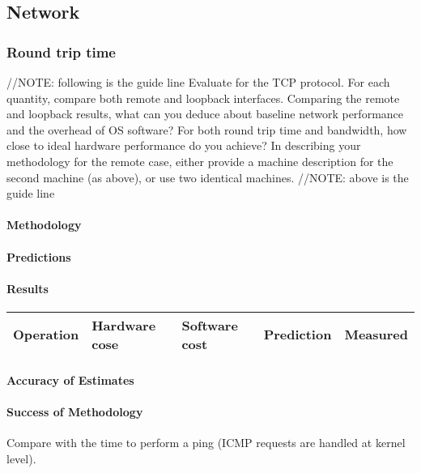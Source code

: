 \subsection{Network}

\subsubsection{Round trip time}

//NOTE: following is the guide line
Evaluate for the TCP protocol. For each quantity, compare both remote and loopback interfaces. Comparing the remote and loopback results, what can you deduce about baseline network performance and the overhead of OS software? For both round trip time and bandwidth, how close to ideal hardware performance do you achieve? In describing your methodology for the remote case, either provide a machine description for the second machine (as above), or use two identical machines.
//NOTE: above is the guide line

\paragraph{Methodology}
\paragraph{Predictions}
\paragraph{Results}

\begin{center}
\begin{tabular}{| l | l | l | l | l |}
\hline
Operation & Hardware cose & Software cost & Prediction & Measured \\
\hline
\end{tabular}
\end{center}

\paragraph{Accuracy of Estimates}
\paragraph{Success of Methodology}

 Compare with the time to perform a ping (ICMP requests are handled at kernel level).






